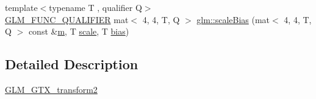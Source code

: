 \begin{DoxyCompactItemize}
\item 
{\footnotesize template$<$typename T , qualifier Q$>$ }\\\mbox{\hyperlink{setup_8hpp_a33fdea6f91c5f834105f7415e2a64407}{G\+L\+M\+\_\+\+F\+U\+N\+C\+\_\+\+Q\+U\+A\+L\+I\+F\+I\+ER}} mat$<$ 4, 4, T, Q $>$ \mbox{\hyperlink{group__gtx__transform2_gae2bdd91a76759fecfbaef97e3020aa8e}{glm\+::scale\+Bias}} (mat$<$ 4, 4, T, Q $>$ const \&\mbox{\hyperlink{_s_d_l__opengl__glext_8h_af593500c283bf1a787a6f947f503a5c2}{m}}, T \mbox{\hyperlink{_s_d_l__opengl__glext_8h_a281421b881aa7a1266842b73a3bc7655}{scale}}, T \mbox{\hyperlink{_s_d_l__opengl__glext_8h_a39c3ffa18f420251c5d132dd8c1c6137}{bias}})
\end{DoxyCompactItemize}


\subsection{Detailed Description}
\mbox{\hyperlink{group__gtx__transform2}{G\+L\+M\+\_\+\+G\+T\+X\+\_\+transform2}} 